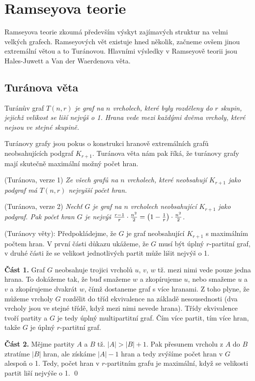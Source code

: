 \section{Ramseyova teorie}
Ramseyova teorie zkoumá především výskyt zajímavých struktur na velmi velkých grafech. Ramseyových vět existuje hned několik, začneme ovšem jinou extremální větou a to Turánovou. Hlavními výsledky v Ramseyově teorii jsou Hales-Juwett a Van der Waerdenova věta.

\subsection{Turánova věta}

\df Turánův graf $T(n,r)$ {\it je graf na $n$ vrcholech, které byly rozděleny do $r$ skupin, jejichž velikost se liší nejvýš o 1. Hrana vede mezi každými dvěma vrcholy, které nejsou ve stejné skupině.}

Turánovy grafy jsou pokus o konstrukci hranově extremálních grafů neobsahujících podgraf $K_{r+1}$. Turánova věta nám pak říká, že turánovy grafy mají skutečně maximální možný počet hran.

\vt (Turánova, verze 1) {\it Ze všech grafů na $n$ vrcholech, které neobsahují $K_{r+1}$ jako podgraf má $T(n,r)$ nejvyšší počet hran.}

\vt (Turánova, verze 2) {\it Nechť $G$ je graf na $n$ vrcholech neobsahující $K_{r+1}$ jako podgraf. Pak počet hran $G$ je nejvýš ${r-1\over r}\cdot{n^2\over 2} = \left(1-{1\over r}\right)\cdot{n^2\over 2}$.}

\dk (Turánovy věty): Předpokládejme, že $G$ je graf neobsahující $K_{r+1}$ s maximálním počtem hran. V první části důkazu ukážeme, že $G$ musí být úplný $r$-partitní graf, v druhé části že se velikost jednotlivých partit může lišit nejvýš o 1.

\textbf{Část 1.} Graf $G$ neobsahuje trojici vrcholů $u$, $v$, $w$ tž. mezi nimi vede pouze jedna hrana. To dokážeme tak, že buď smažeme $w$ a zkopírujeme $u$, nebo smažeme $u$ a $v$ a zkopírujeme dvakrát $w$, čímž dostaneme graf s více hranami. Z toho plyne, že můžeme vrcholy $G$ rozdělit do tříd ekvivalence na základě nesousednosti (dva vrcholy jsou ve stejné třídě, když mezi nimi nevede hrana). Třídy ekvivalence tvoří partity a $G$ je tedy úplný multipartitní graf. Čím více partit, tím více hran, takže $G$ je úplný $r$-partitní graf.

\textbf{Část 2.} Mějme partity $A$ a $B$ tž. $|A| > |B| + 1$. Pak přesunem vrcholu z $A$ do $B$ ztratíme $|B|$ hran, ale získáme $|A|-1$ hran a tedy zvýšíme počet hran v $G$ alespoň o 1. Tedy, počet hran v $r$-partitním grafu je maximální, když se velikosti partit liší nejvýše o 1.
\qed

